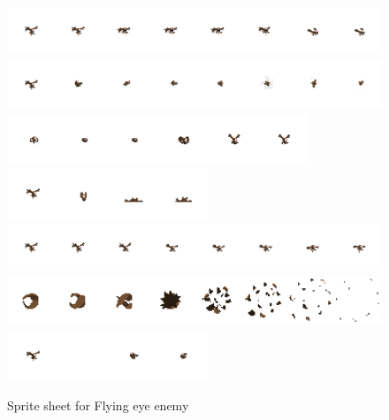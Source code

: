 \documentclass{article}
\begin{document}
\begin{figure}[H]
\centering
\includegraphics[height = 1.5cm]{Flying_eye_Attack}
\includegraphics[height = 1.5cm]{Flying_eye_Attac2}
\includegraphics[height = 1.5cm]{Flying_eye_Attack3}
\includegraphics[height = 1.5cm]{Flying_eye_Death}
\includegraphics[height = 1.5cm]{Flying_eye_Flight}
\includegraphics[height = 1.5cm]{Flying_eye_projectile_sprite}
\includegraphics[height = 1.5cm]{Flying_eye_Take Hit}
\caption{Sprite sheet for Flying eye enemy}
\label{flying_eye_sprite}
\end{figure}
\end{document}
